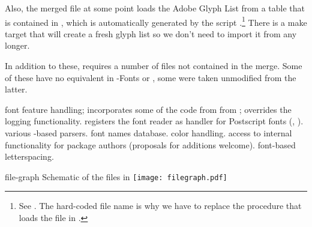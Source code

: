Also, the merged file at some point loads the Adobe Glyph List from a
\LUA table that is contained in ,
which is automatically generated by the script
.\footnote{%
  See .
  The hard-coded file name is why we have to replace the procedure
  that loads the file in .
}
There is a make target  that will create a fresh
glyph list so we don’t need to import it from \CONTEXT any longer.

In addition to these,  requires a number of
files not contained in the merge. Some of these have no equivalent in
\LUATEX-Fonts or \CONTEXT, some were taken unmodified from the latter.


\beginfilelist
         font feature handling;
                                           incorporates some of the code from
                                            from \CONTEXT;
         overrides the \CONTEXT logging
                                           functionality.
          registers the \OpenType
                                           font reader as handler for
                                           Postscript fonts
                                           (, ).
          various -based parsers.
         font names database.
           color handling.
        access to internal functionality
                                           for package authors
                                           (proposals for additions welcome).
      font-based letterspacing.
\endfilelist

\beginfigurefloat
  {file-graph}
  {Schematic of the files in }
  \texttt{[image: filegraph.pdf]}
\endfigurefloat

\endsection


